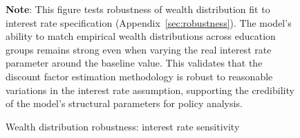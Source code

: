 \documentclass{econsocart}
\begin{document}
\begin{figure}[htb]
  \centering
  \caption{\pregenmark Wealth distribution robustness: interest rate sensitivity}
  \label{fig:LorenzPts_robustness_R} %

  \medskip
  \noindent\parbox{\textwidth}{\footnotesize
    \textbf{Note}: This figure tests robustness of wealth distribution fit to interest rate specification
    (Appendix~\ref{sec:robustness}).
    The model's ability to match empirical wealth distributions across education groups
    remains strong even when varying the real interest rate parameter around the baseline value.
    This validates that the discount factor estimation methodology is robust to reasonable
    variations in the interest rate assumption, supporting the credibility of the model's
    structural parameters for policy analysis.
  }
\end{figure}
\end{document}
